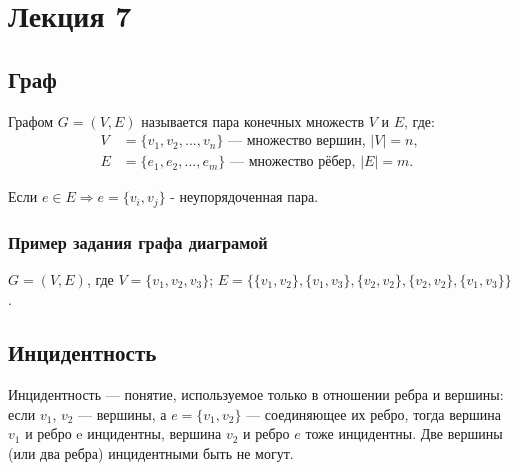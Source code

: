 \documentclass[a4paper,12pt]{article} %
\begin{document}
\tableofcontents
\clearpage

\setcounter{section}{6}
\section{Лекция 7}
    \subsection{Граф}
    Графом $G = (V, E)$ называется пара конечных множеств $V$ и $E$, где:
    \begin{align*}
        V &= \{v_1, v_2, ..., v_n\} \text{ --- множество вершин, } |V| = n,\\
        E &= \{e_1, e_2, ..., e_m\} \text{ --- множество рёбер, } |E| = m.
    \end{align*}
    
    Если $e \in E \Rightarrow e =\{ v_i, v_j \}$ - неупорядоченная пара.
    
    \subsubsection{Пример задания графа диаграмой}
    \begin{center}
        $G = (V, E)$, где $V = \{v_1, v_2, v_3\}$; $E = \big\{ \{v_1, v_2\}, \{v_1, v_3\}, \{v_2, v_2\}, \{v_2, v_2\}, \{v_1, v_3\} \big\}$.
        

    \end{center}
    
    \subsection{Инцидентность}
    Инцидентность --- понятие, используемое только в отношении ребра и вершины: если $v_1$, $v_2$ --- вершины, а $e=\{v_1,v_2\}$ --- соединяющее их ребро,
    тогда вершина $v_1$ и ребро e инцидентны, вершина $v_2$ и ребро $e$ тоже инцидентны. Две вершины (или два ребра) инцидентными быть не могут.
    
\end{document}
